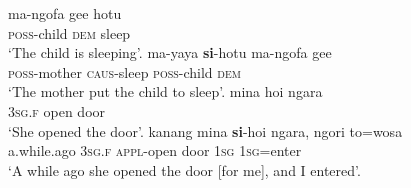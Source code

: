 \ea {} \citep[130ff.]{hayami-allen:2001}
\ea\label{ex:Ternate:sleep:a}
	\gll	ma-ngofa gee hotu \\
			\textsc{poss}-child \textsc{dem} sleep \\
	\glt	‘The child is sleeping’.
\ex\label{ex:Ternate:sleep:b}
	\gll	ma-yaya \textbf{si}-hotu ma-ngofa gee \\
			\textsc{poss}-mother \textsc{caus}-sleep \textsc{poss}-child \textsc{dem} \\
	\glt	‘The mother put the child to sleep’.
\ex\label{ex:Ternate:open:a}
	\gll	mina hoi ngara \\
			\textsc{3sg.f} open door \\
	\glt	‘She opened the door’.
\ex\label{ex:Ternate:open:b}
	\gll	kanang mina \textbf{si}-hoi ngara, ngori to=wosa \\
			a.while.ago \textsc{3sg.f} \textsc{appl}-open door \textsc{1sg} \textsc{1sg}=enter \\
	\glt	‘A while ago she opened the door [for me], and I entered’.
	\z 
\z


